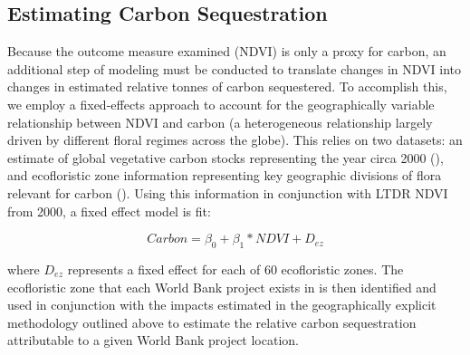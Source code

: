 \documentclass[sustainability,article,submit,moreauthors,pdftex,10pt,a4paper]{mdpi}
\begin{document}
\subsection{Estimating Carbon Sequestration}
Because the outcome measure examined (NDVI) is only a proxy for carbon, an additional step of modeling must be conducted to translate changes in NDVI into changes in estimated relative tonnes of carbon sequestered. To accomplish this, we employ a fixed-effects approach to account for the geographically variable relationship between NDVI and carbon (a heterogeneous relationship largely driven by different floral regimes across the globe). This relies on two datasets: an estimate of global vegetative carbon stocks representing the year circa 2000 (\cite{saatchi_benchmark_2011}), and ecofloristic zone information representing key geographic divisions of flora relevant for carbon (\cite{ruesch_new_2008}). Using this information in conjunction with LTDR NDVI from 2000, a fixed effect model is fit:

\begin{equation}
Carbon = \beta_{0} + \beta_{1} * NDVI + D_{ez}
\label{EQcarb}
\end{equation}

where \begin{math}D_{ez}\end{math} represents a fixed effect for each of 60 ecofloristic zones. The ecofloristic zone that each World Bank project exists in is then identified and used in conjunction with the impacts estimated in the geographically explicit methodology outlined above to estimate the relative carbon sequestration attributable to a given World Bank project location.
\end{document}
